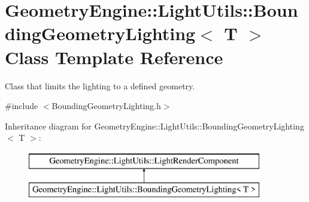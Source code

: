 \hypertarget{class_geometry_engine_1_1_light_utils_1_1_bounding_geometry_lighting}{}\section{Geometry\+Engine\+::Light\+Utils\+::Bounding\+Geometry\+Lighting$<$ T $>$ Class Template Reference}
\label{class_geometry_engine_1_1_light_utils_1_1_bounding_geometry_lighting}


Class that limits the lighting to a defined geometry.  




{\ttfamily \#include $<$Bounding\+Geometry\+Lighting.\+h$>$}

Inheritance diagram for Geometry\+Engine\+::Light\+Utils\+::Bounding\+Geometry\+Lighting$<$ T $>$\+:\begin{figure}[H]
\begin{center}
\leavevmode
\includegraphics[height=2.000000cm]{class_geometry_engine_1_1_light_utils_1_1_bounding_geometry_lighting}
\end{center}
\end{figure}
